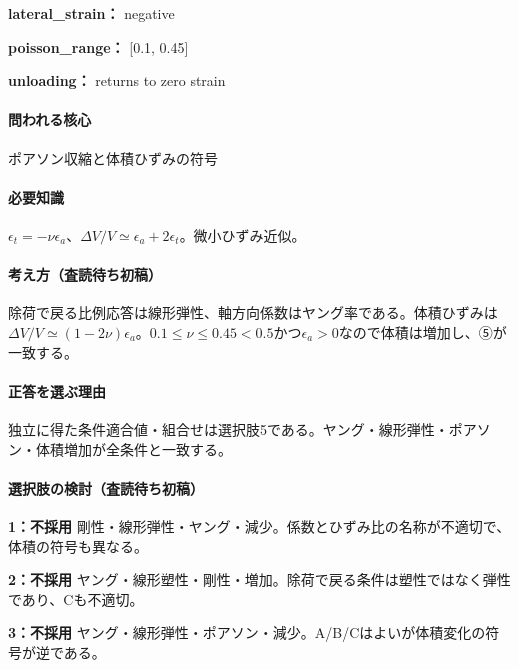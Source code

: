 \noindent\textbf{lateral\_strain：} negative\par

\noindent\textbf{poisson\_range：} [0.1, 0.45]\par

\noindent\textbf{unloading：} returns to zero strain\par

\paragraph{問われる核心} ポアソン収縮と体積ひずみの符号

\paragraph{必要知識} \(\epsilon_t=-\nu\epsilon_a\)、\(\Delta V/V\simeq\epsilon_a+2\epsilon_t\)。微小ひずみ近似。

\paragraph{考え方（査読待ち初稿）} 除荷で戻る比例応答は線形弾性、軸方向係数はヤング率である。体積ひずみは\(\Delta V/V\simeq(1-2\nu)\epsilon_a\)。\(0.1\le\nu\le0.45<0.5\)かつ\(\epsilon_a>0\)なので体積は増加し、⑤が一致する。

\paragraph{正答を選ぶ理由} 独立に得た条件適合値・組合せは選択肢5である。ヤング・線形弾性・ポアソン・体積増加が全条件と一致する。

\paragraph{選択肢の検討（査読待ち初稿）}\mbox{}\par

\noindent\textbf{1：不採用} 剛性・線形弾性・ヤング・減少。係数とひずみ比の名称が不適切で、体積の符号も異なる。\par

\noindent\textbf{2：不採用} ヤング・線形塑性・剛性・増加。除荷で戻る条件は塑性ではなく弾性であり、Cも不適切。\par

\noindent\textbf{3：不採用} ヤング・線形弾性・ポアソン・減少。A/B/Cはよいが体積変化の符号が逆である。\par

